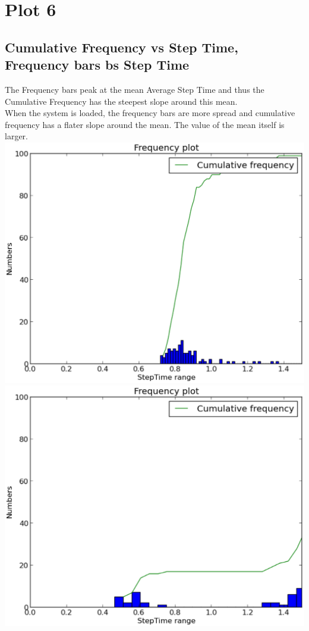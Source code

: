 \documentclass[a4paper,11pt]{report}
\begin{document}
\section{Plot 6}
\subsection{Cumulative Frequency vs Step Time, Frequency bars bs Step Time} 
The Frequency bars peak at the mean Average Step Time and thus the Cumulative Frequency has the steepest slope around this mean.\\ 
When the system is loaded, the frequency bars are more spread and cumulative frequency has a flater slope around the mean. The value of the mean itself is larger.\\
\includegraphics[scale=.3]{doc/g12_plot06.eps}
\includegraphics[scale=.3]{doc/g12_plotload06.eps} \\
\end{document}
